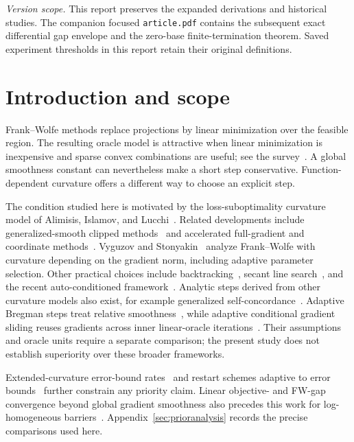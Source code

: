 \documentclass[11pt]{article}
\begin{document}
\noindent\emph{Version scope.} This report preserves the expanded
derivations and historical studies. The companion focused
\texttt{article.pdf} contains the subsequent exact differential
gap envelope and the zero-base finite-termination theorem. Saved
experiment thresholds in this report retain their original definitions.

\section{Introduction and scope}
Frank--Wolfe methods replace projections by linear minimization over the
feasible region. The resulting oracle model is attractive when linear
minimization is inexpensive and sparse convex combinations are useful;
see the survey~\cite{braun}. A global smoothness constant can nevertheless
make a short step conservative. Function-dependent curvature offers a
different way to choose an explicit step.

The condition studied here is motivated by the loss-suboptimality curvature
model of Alimisis, Islamov, and Lucchi~\cite{warmup}. Related developments
include generalized-smooth clipped methods~\cite{lobanovkoloskova} and
accelerated full-gradient and coordinate methods~\cite{lobanov}.
Vyguzov and Stonyakin~\cite{vyguzov} analyze Frank--Wolfe with curvature
depending on the gradient norm, including adaptive parameter selection.
Other practical choices include backtracking~\cite{pedregosa}, secant
line search~\cite{hendrych}, and the recent auto-conditioned framework~\cite{autoconditioned}.
Analytic steps derived from other curvature
models also exist, for example generalized self-concordance~\cite{selfconcordant}.
Adaptive Bregman steps treat relative smoothness~\cite{bregmanfw}, while
adaptive conditional gradient sliding reuses gradients across inner
linear-oracle iterations~\cite{adcgs}. Their assumptions and oracle units
require a separate comparison; the present study does not establish
superiority over these broader frameworks.

Extended-curvature error-bound rates~\cite{wirth} and restart schemes
adaptive to error bounds~\cite{restartfw} further constrain any priority
claim. Linear objective- and FW-gap convergence beyond global gradient
smoothness also precedes this work for log-homogeneous barriers~\cite{zhao}.
Appendix~\ref{sec:prioranalysis} records the precise comparisons used here.
\end{document}
